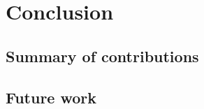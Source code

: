 \chapter{Conclusion}\label{sec:Conclusion}
%
%



\section{Summary of contributions}\label{sec:summary_of_contributions}
%
%



\section{Future work}\label{sec:future_work}
%
%